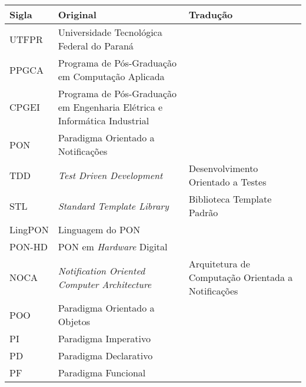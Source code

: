 \begin{table}[h!]
\begin{tabularx}{\textwidth}{l|X|X}
Sigla   & Original                                                                  & Tradução                                           \\ \hline
UTFPR   & Universidade Tecnológica Federal do Paraná                                &                                                    \\ \hline
PPGCA   & Programa de Pós-Graduação em Computação Aplicada                          &                                                    \\ \hline
CPGEI   & Programa de Pós-Graduação em Engenharia Elétrica e Informática Industrial &                                                    \\ \hline
PON     & Paradigma Orientado a Notificações                                        &                                                    \\ \hline
TDD     & \textit{Test Driven Development}                                          & Desenvolvimento Orientado a Testes                 \\ \hline
STL     & \textit{Standard Template Library}                                        & Biblioteca Template Padrão                         \\ \hline
LingPON & Linguagem do PON                                                          &                                                    \\ \hline
PON-HD  & PON em \textit{Hardware} Digital                                          &                                                    \\ \hline
NOCA    & \textit{Notification Oriented Computer Architecture}                      & Arquitetura de Computação Orientada a Notificações \\ \hline
POO     & Paradigma Orientado a Objetos                                             &                                                    \\ \hline
PI      & Paradigma Imperativo                                                      &                                                    \\ \hline
PD      & Paradigma Declarativo                                                     &                                                    \\ \hline
PF      & Paradigma Funcional                                                       &                                                    \\ \hline

\end{tabularx}
\end{table}
